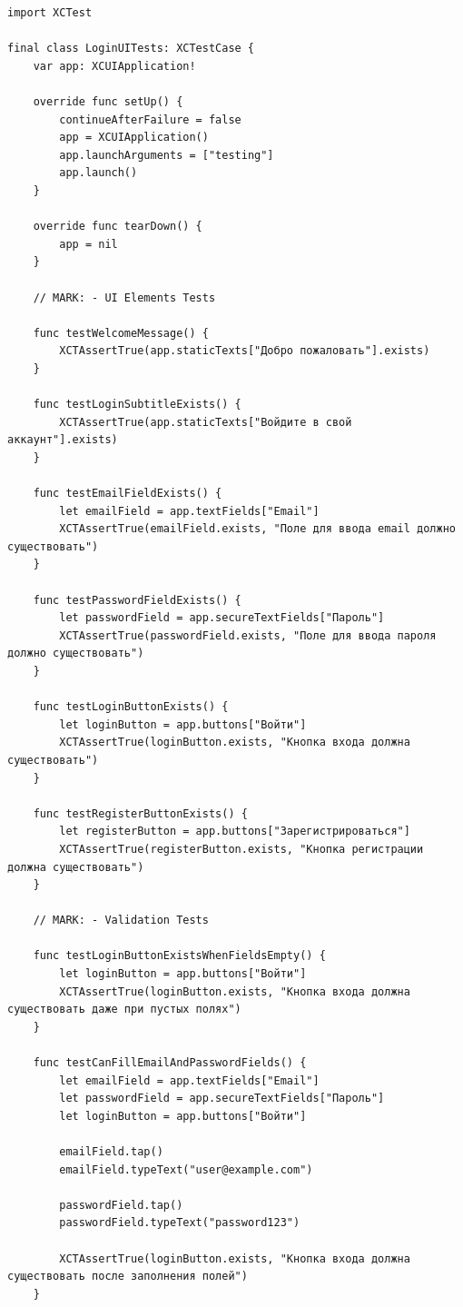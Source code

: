 \begin{lstlisting}[basicstyle=\tiny\ttfamily,breaklines=true]
import XCTest

final class LoginUITests: XCTestCase {
    var app: XCUIApplication!

    override func setUp() {
        continueAfterFailure = false
        app = XCUIApplication()
        app.launchArguments = ["testing"]
        app.launch()
    }

    override func tearDown() {
        app = nil
    }

    // MARK: - UI Elements Tests

    func testWelcomeMessage() {
        XCTAssertTrue(app.staticTexts["Добро пожаловать"].exists)
    }

    func testLoginSubtitleExists() {
        XCTAssertTrue(app.staticTexts["Войдите в свой аккаунт"].exists)
    }

    func testEmailFieldExists() {
        let emailField = app.textFields["Email"]
        XCTAssertTrue(emailField.exists, "Поле для ввода email должно существовать")
    }

    func testPasswordFieldExists() {
        let passwordField = app.secureTextFields["Пароль"]
        XCTAssertTrue(passwordField.exists, "Поле для ввода пароля должно существовать")
    }

    func testLoginButtonExists() {
        let loginButton = app.buttons["Войти"]
        XCTAssertTrue(loginButton.exists, "Кнопка входа должна существовать")
    }

    func testRegisterButtonExists() {
        let registerButton = app.buttons["Зарегистрироваться"]
        XCTAssertTrue(registerButton.exists, "Кнопка регистрации должна существовать")
    }

    // MARK: - Validation Tests

    func testLoginButtonExistsWhenFieldsEmpty() {
        let loginButton = app.buttons["Войти"]
        XCTAssertTrue(loginButton.exists, "Кнопка входа должна существовать даже при пустых полях")
    }

    func testCanFillEmailAndPasswordFields() {
        let emailField = app.textFields["Email"]
        let passwordField = app.secureTextFields["Пароль"]
        let loginButton = app.buttons["Войти"]

        emailField.tap()
        emailField.typeText("user@example.com")

        passwordField.tap()
        passwordField.typeText("password123")

        XCTAssertTrue(loginButton.exists, "Кнопка входа должна существовать после заполнения полей")
    }


\end{lstlisting}
